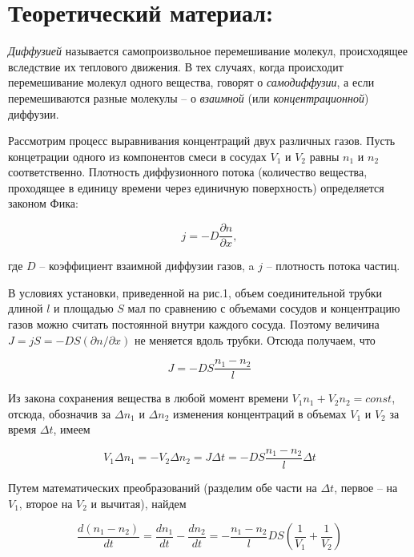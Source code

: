 \documentclass[a4paper,12pt]{article}
\theoremstyle{plain} %
\theoremstyle{definition} %
\theoremstyle{remark} %
\begin{document}
\section{Теоретический материал:}
    \textit{Диффузией} называется самопроизвольное перемешивание молекул,         происходящее вследствие их теплового движения. В тех случаях, когда происходит перемешивание молекул одного вещества, говорят о \textit{самодиффузии}, а если перемешиваются разные молекулы -- о \textit{взаимной} (или \textit{концентрационной}) диффузии.

    Рассмотрим процесс выравнивания концентраций двух различных газов. Пусть концетрации одного из компонентов смеси в сосудах $V_1$ и $V_2$ равны $n_1$ и $n_2$ соответственно. Плотность диффузионного потока (количество вещества, проходящее в единицу времени через единичную поверхность) определяется законом Фика:
    
    \begin{equation}
        j = -D\dfrac{\partial n}{\partial x},
    \end{equation}
    
    где $D$ -- коэффициент взаимной диффузии газов,  a $j$ -- плотность потока частиц.
    
    В условиях установки, приведенной на рис.1, объем соединительной трубки длиной $l$ и площадью $S$ мал по сравнению с объемами сосудов и концентрацию газов можно считать постоянной внутри каждого сосуда. Поэтому величина $J = jS = -DS(\partial n / \partial x)$ не меняется вдоль трубки. Отсюда получаем, что
    
    \begin{equation}
        J = -DS\dfrac{n_1 - n_2}{l}
    \end{equation}
    
    Из закона сохранения вещества в любой момент времени $V_1n_1 + V_2n_2 = const$, отсюда, обозначив за $\Delta n_1$ и $\Delta n_2$ изменения концентраций в объемах $V_1$ и $V_2$ за время $\Delta t$, имеем
    
    \begin{equation}
        V_1 \Delta n_1 = -V_2 \Delta n_2 = J \Delta t = -DS\dfrac{n_1 - n_2}{l} \Delta t
    \end{equation}
    
    Путем математических преобразований (разделим обе части на $\Delta t$, первое -- на $V_1$, второе на $V_2$ и вычитая), найдем
    
    \begin{equation}
        \dfrac{d(n_1 - n_2)}{dt} = \dfrac{dn_1}{dt} - \dfrac{dn_2}{dt} = -\dfrac{n_1 - n_2}{l}DS(\dfrac{1}{V_1} + \dfrac{1}{V_2})
    \end{equation} 
    
\end{document}
